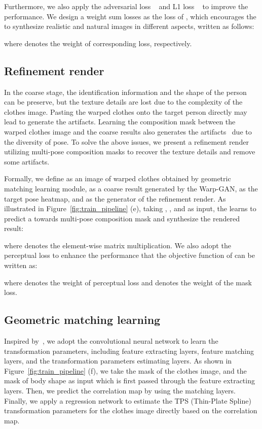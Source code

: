 \documentclass[10pt,twocolumn,letterpaper]{article}
\begin{document}
Furthermore, we also apply the adversarial loss ~\cite{goodfellow2014generative,mirza2014cgan} and L1 loss ~\cite{yan2017skeleton} to improve the performance. We design a weight sum losses as the loss of , which encourages the  to synthesize realistic and natural images in different aspects, written as follows:

 where   denotes the weight of corresponding loss, respectively. 

\subsection{Refinement render}
\label{s:rr}
In the coarse stage, the identification information and the shape of the person can be preserve, but the texture details are lost due to the complexity of the clothes image. Pasting the warped clothes onto the target person directly may lead to generate the artifacts. Learning the composition mask between the warped clothes image and the coarse results also generates the artifacts~\cite{han2017viton,wang2018cpvton} due to the diversity of pose. To solve the above issues, we present a refinement render utilizing multi-pose composition masks to recover the texture
details and remove some artifacts.

Formally, we define  as an image of warped clothes obtained by geometric matching learning module,  as a coarse result generated by the Warp-GAN,  as the target pose heatmap, and  as the generator of the refinement render. As illustrated in Figure~\ref{fig:train_pipeline} (e), taking , , and  as input, the  learns to predict a towards multi-pose composition mask and synthesize the rendered result:

where  denotes the element-wise matrix multiplication. We also adopt the perceptual loss to enhance the performance that the objective function of  can be written as:

where  denotes the weight of perceptual loss and  denotes the weight of the mask loss.

\subsection{Geometric matching learning}
\label{s:gml}
Inspired by~\cite{Rocco2017geocnn}, we adopt the convolutional neural network to learn the transformation parameters, including feature extracting layers, feature matching layers, and the transformation parameters estimating layers. As shown in Figure~\ref{fig:train_pipeline} (f), we take the mask of the clothes image, and the mask of body shape as input which is first passed through the feature extracting layers. Then, we predict the correlation map by using the matching layers. Finally, we apply a regression network to estimate the TPS (Thin-Plate Spline)~\cite{bookstein1989tps} transformation parameters for the clothes image directly based on the correlation map. 
\end{document}
